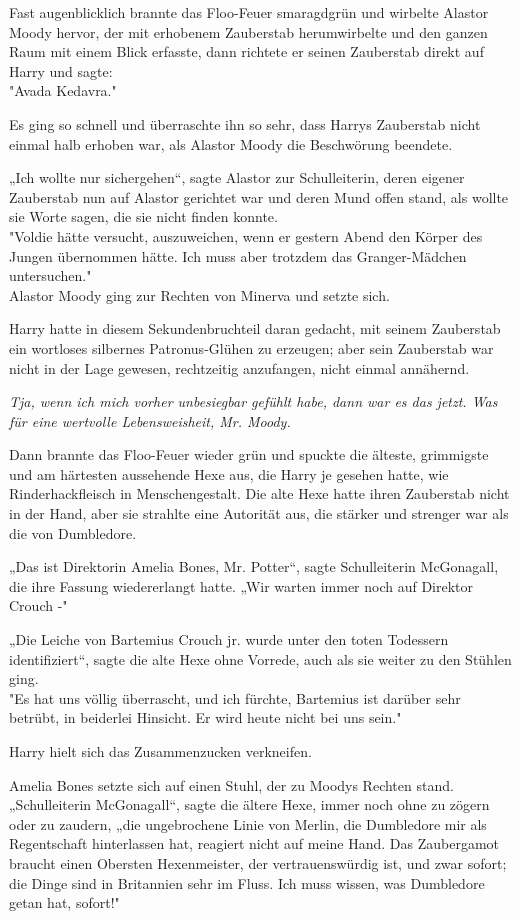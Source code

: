 {Fast augenblicklich brannte das Floo-Feuer smaragdgrün und wirbelte Alastor Moody hervor, der mit erhobenem Zauberstab herumwirbelte und den ganzen Raum mit einem Blick erfasste, dann richtete er seinen Zauberstab direkt auf Harry und sagte:\\ "Avada Kedavra."

Es ging so schnell und überraschte ihn so sehr, dass Harrys Zauberstab nicht einmal halb erhoben war, als Alastor Moody die Beschwörung beendete.

„Ich wollte nur sichergehen“, sagte Alastor zur Schulleiterin, deren eigener Zauberstab nun auf Alastor gerichtet war und deren Mund offen stand, als wollte sie Worte sagen, die sie nicht finden konnte.\\ "Voldie hätte versucht, auszuweichen, wenn er gestern Abend den Körper des Jungen übernommen hätte. Ich muss aber trotzdem das Granger-Mädchen untersuchen."\\ Alastor Moody ging zur Rechten von Minerva und setzte sich.

Harry hatte in diesem Sekundenbruchteil daran gedacht, mit seinem Zauberstab ein wortloses silbernes Patronus-Glühen zu erzeugen; aber sein Zauberstab war nicht in der Lage gewesen, rechtzeitig anzufangen, nicht einmal annähernd.

\emph{Tja, wenn ich mich vorher unbesiegbar gefühlt habe, dann war es das jetzt. Was für eine wertvolle Lebensweisheit, Mr. Moody.}

Dann brannte das Floo-Feuer wieder grün und spuckte die älteste, grimmigste und am härtesten aussehende Hexe aus, die Harry je gesehen hatte, wie Rinderhackfleisch in Menschengestalt. Die alte Hexe hatte ihren Zauberstab nicht in der Hand, aber sie strahlte eine Autorität aus, die stärker und strenger war als die von Dumbledore.

„Das ist Direktorin Amelia Bones, Mr. Potter“, sagte Schulleiterin McGonagall, die ihre Fassung wiedererlangt hatte. „Wir warten immer noch auf Direktor Crouch -"

„Die Leiche von Bartemius Crouch jr. wurde unter den toten Todessern identifiziert“, sagte die alte Hexe ohne Vorrede, auch als sie weiter zu den Stühlen ging.\\ "Es hat uns völlig überrascht, und ich fürchte, Bartemius ist darüber sehr betrübt, in beiderlei Hinsicht. Er wird heute nicht bei uns sein."

Harry hielt sich das Zusammenzucken verkneifen.

Amelia Bones setzte sich auf einen Stuhl, der zu Moodys Rechten stand.\\ „Schulleiterin McGonagall“, sagte die ältere Hexe, immer noch ohne zu zögern oder zu zaudern, „die ungebrochene Linie von Merlin, die Dumbledore mir als Regentschaft hinterlassen hat, reagiert nicht auf meine Hand. Das Zaubergamot braucht einen Obersten Hexenmeister, der vertrauenswürdig ist, und zwar sofort; die Dinge sind in Britannien sehr im Fluss. Ich muss wissen, was Dumbledore getan hat, sofort!"

}
